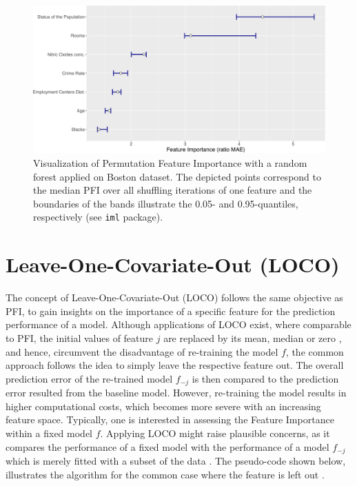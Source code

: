 \documentclass[]{krantz}
\begin{document}
\begin{figure}
\centering
\includegraphics{book_files/figure-latex/plot-1.pdf}
\caption{\label{fig:plot}Visualization of Permutation Feature Importance
with a random forest applied on Boston dataset. The depicted points
correspond to the median PFI over all shuffling iterations of one
feature and the boundaries of the bands illustrate the 0.05- and
0.95-quantiles, respectively (see \texttt{iml} package).}
\end{figure}

\section{Leave-One-Covariate-Out
(LOCO)}\label{leave-one-covariate-out-loco}

The concept of Leave-One-Covariate-Out (LOCO) follows the same objective
as PFI, to gain insights on the importance of a specific feature for the
prediction performance of a model. Although applications of LOCO exist,
where comparable to PFI, the initial values of feature \(j\) are
replaced by its mean, median or zero \citep[see][]{hall2017ideas}, and
hence, circumvent the disadvantage of re-training the model \(f\), the
common approach follows the idea to simply leave the respective feature
out. The overall prediction error of the re-trained model \(f_{-j}\) is
then compared to the prediction error resulted from the baseline model.
However, re-training the model results in higher computational costs,
which becomes more severe with an increasing feature space. Typically,
one is interested in assessing the Feature Importance within a fixed
model \(f\). Applying LOCO might raise plausible concerns, as it
compares the performance of a fixed model with the performance of a
model \(f_{-j}\) which is merely fitted with a subset of the data
\citep[see][]{molnar2019}. The pseudo-code shown below, illustrates the
algorithm for the common case where the feature is left out
\citep[see][]{lei2018distribution}.
\end{document}
